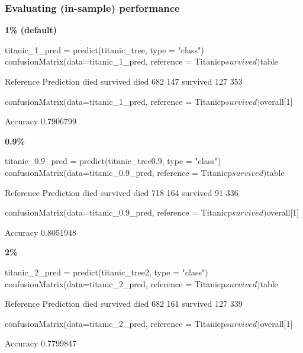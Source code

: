 \documentclass[a4paper]{article}\usepackage[]{graphicx}\usepackage[]{xcolor}
\begin{document}
\subsubsection{Evaluating (in-sample) performance}
\textbf{1\% (default)}
\begin{Schunk}
\begin{Sinput}
titanic_1_pred = predict(titanic_tree, type = "class")
confusionMatrix(data=titanic_1_pred, reference = Titanicp$survived)$table
\end{Sinput}
\begin{Soutput}
          Reference
Prediction died survived
  died      682      147
  survived  127      353
\end{Soutput}
\begin{Sinput}
confusionMatrix(data=titanic_1_pred, reference = Titanicp$survived)$overall[1]
\end{Sinput}
\begin{Soutput}
 Accuracy 
0.7906799 
\end{Soutput}
\end{Schunk}
\textbf{0.9\%}
\begin{Schunk}
\begin{Sinput}
titanic_0.9_pred = predict(titanic_tree0.9, type = "class")
confusionMatrix(data=titanic_0.9_pred, 
                reference = Titanicp$survived)$table
\end{Sinput}
\begin{Soutput}
          Reference
Prediction died survived
  died      718      164
  survived   91      336
\end{Soutput}
\begin{Sinput}
confusionMatrix(data=titanic_0.9_pred,
                reference = Titanicp$survived)$overall[1]
\end{Sinput}
\begin{Soutput}
 Accuracy 
0.8051948 
\end{Soutput}
\end{Schunk}
\textbf{2\%}
\begin{Schunk}
\begin{Sinput}
titanic_2_pred = predict(titanic_tree2, type = "class")
confusionMatrix(data=titanic_2_pred, 
                reference = Titanicp$survived)$table
\end{Sinput}
\begin{Soutput}
          Reference
Prediction died survived
  died      682      161
  survived  127      339
\end{Soutput}
\begin{Sinput}
confusionMatrix(data=titanic_2_pred,
                reference = Titanicp$survived)$overall[1]
\end{Sinput}
\begin{Soutput}
 Accuracy 
0.7799847 
\end{Soutput}
\end{Schunk}
\end{document}
